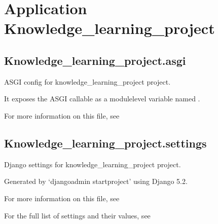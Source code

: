 \documentclass[letterpaper,10pt,english]{sphinxmanual}
\begin{document}
\sphinxstepscope


\chapter{Application Knowledge\_learning\_project}
\label{\detokenize{knowledge_learning_project:application-knowledge-learning-project}}\label{\detokenize{knowledge_learning_project::doc}}

\section{Knowledge\_learning\_project.asgi}
\label{\detokenize{knowledge_learning_project:module-knowledge_learning_project.asgi}}\label{\detokenize{knowledge_learning_project:knowledge-learning-project-asgi}}
\sphinxAtStartPar
ASGI config for knowledge\_learning\_project project.

\sphinxAtStartPar
It exposes the ASGI callable as a module\sphinxhyphen{}level variable named .

\sphinxAtStartPar
For more information on this file, see


\section{Knowledge\_learning\_project.settings}
\label{\detokenize{knowledge_learning_project:module-knowledge_learning_project.settings}}\label{\detokenize{knowledge_learning_project:knowledge-learning-project-settings}}
\sphinxAtStartPar
Django settings for knowledge\_learning\_project project.

\sphinxAtStartPar
Generated by ‘django\sphinxhyphen{}admin startproject’ using Django 5.2.

\sphinxAtStartPar
For more information on this file, see

\sphinxAtStartPar
For the full list of settings and their values, see
\end{document}
